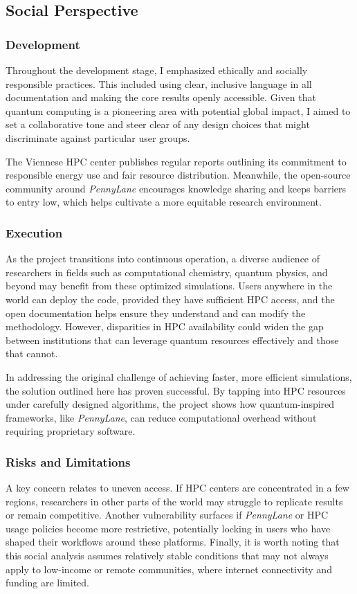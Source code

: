 \subsection{Social Perspective}

\subsubsection{Development}
Throughout the development stage, I emphasized ethically and socially responsible practices. This included using clear, inclusive language in all documentation and making the core results openly accessible. Given that quantum computing is a pioneering area with potential global impact, I aimed to set a collaborative tone and steer clear of any design choices that might discriminate against particular user groups.

The Viennese HPC center publishes regular reports outlining its commitment to responsible energy use and fair resource distribution. Meanwhile, the open-source community around \emph{PennyLane} encourages knowledge sharing and keeps barriers to entry low, which helps cultivate a more equitable research environment.

\subsubsection{Execution}
As the project transitions into continuous operation, a diverse audience of researchers in fields such as computational chemistry, quantum physics, and beyond may benefit from these optimized simulations. Users anywhere in the world can deploy the code, provided they have sufficient HPC access, and the open documentation helps ensure they understand and can modify the methodology. However, disparities in HPC availability could widen the gap between institutions that can leverage quantum resources effectively and those that cannot.

In addressing the original challenge of achieving faster, more efficient simulations, the solution outlined here has proven successful. By tapping into HPC resources under carefully designed algorithms, the project shows how quantum-inspired frameworks, like \emph{PennyLane}, can reduce computational overhead without requiring proprietary software.

\subsubsection{Risks and Limitations}
A key concern relates to uneven access. If HPC centers are concentrated in a few regions, researchers in other parts of the world may struggle to replicate results or remain competitive. Another vulnerability surfaces if \emph{PennyLane} or HPC usage policies become more restrictive, potentially locking in users who have shaped their workflows around these platforms. Finally, it is worth noting that this social analysis assumes relatively stable conditions that may not always apply to low-income or remote communities, where internet connectivity and funding are limited.

